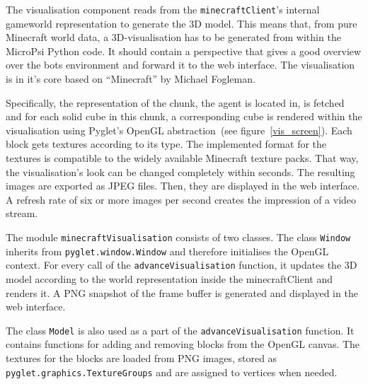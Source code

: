 
The visualisation component reads from the \texttt{minecraftClient}'s internal gameworld representation to generate the 3D model. This means that, from pure Minecraft world data, a 3D-visualisation has to be generated from within the MicroPsi Python code. It should contain a perspective that gives a good overview over the bots environment and forward it to the web interface. The visualisation is in it's core based on ``Minecraft'' by Michael Fogleman.

Specifically, the representation of the chunk, the agent is located in, is fetched and for each solid cube in this chunk, a corresponding cube is rendered within the visualisation using Pyglet's OpenGL abstraction~(see figure~\ref{vis_screen}). Each block gets textures according to its type. The implemented format for the textures is compatible to the widely available Minecraft texture packs. That way, the visualisation's look can be changed completely within seconds. The resulting images are exported as JPEG files. Then, they are displayed in the web interface. A refresh rate of six or more images per second creates the impression of a video stream.


The module \texttt{minecraftVisualisation} consists of two classes. The class \texttt{Window} inherits from \texttt{pyglet.window.Window} and therefore initialises the OpenGL context. For every call of the \texttt{advanceVisualisation} function, it updates the 3D model according to the world representation inside the minecraftClient and renders it. A PNG snapshot of the frame buffer is generated and displayed in the web interface.

The class \texttt{Model} is also used as a part of the \texttt{advanceVisualisation} function. It contains functions for adding and removing blocks from the OpenGL canvas. The textures for the blocks are loaded from PNG images, stored as \texttt{pyglet.graphics.TextureGroups} and are assigned to vertices when needed.



